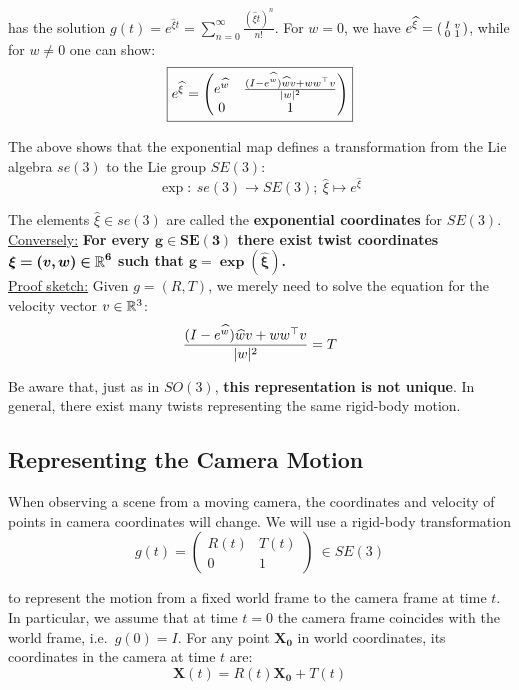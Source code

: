 has the solution $g(t) = e^{\widehat{\xi}t} = \sum_{n=0}^{\infty}
\frac{{(\widehat{\xi}t)}^n}{n!}$.
For $w = 0$, we have $e^{\widehat{\xi}} = \left(\begin{smallmatrix} I & v \\ 0 & 1 \end{smallmatrix} \right)$,
while for $w \ne 0$ one can show:
	\[\boxed{e^{\widehat{\xi}} = \begin{pmatrix}
		e^{\widehat{w}} & \frac{(I-e^{\widehat{w}})\widehat{w}v + ww^{\top}v}{|w|^2}\\
		0 & 1
	\end{pmatrix}}\]

The above shows that the exponential map defines a transformation from
the Lie algebra $se(3)$ to the Lie group $SE(3)$:
	\[ \exp:\ se(3) \rightarrow SE(3);\ \widehat{\xi} \mapsto e^{\widehat{\xi}}\]

The elements $\widehat{\xi} \in se(3)$ are called the
\textbf{exponential coordinates} for $SE(3)$.\\

\underline{Conversely:} \textbf{For every $\bm{g \in SE(3)}$ there exist
twist coordinates $\bm{\xi = (v,w) \in \mathbb{R}^6}$ such that $\bm{g=\exp(\widehat{\xi})}$.}\\

\underline{Proof sketch:} Given $g = (R,T)$, we merely need to solve the equation
for the velocity vector $v \in \mathbb{R}^3$:
	\[\frac{(I-e^{\widehat{w}})\widehat{w}v + ww^{\top}v}{|w|^2} = T\]


Be aware that, just as in $SO(3)$, \textbf{this representation is not unique}.
In general, there exist many twists representing the same rigid-body motion.


\subsection{Representing the Camera Motion}%
\label{sub:representing_the_camera_motion}

When observing a scene from a moving camera, the coordinates and velocity
of points in camera coordinates will change. We will use a rigid-body transformation
	\[g(t) = \begin{pmatrix}
		R(t) & T(t) \\
		0 & 1
	\end{pmatrix}\ \in SE(3)\]

to represent the motion from a fixed world frame to the camera frame at time $t$.
In particular, we assume that at time $t=0$ the camera frame coincides with the
world frame, i.e.\ $g(0)=I$.
For any point $\bm{X_0}$ in world coordinates,
its coordinates in the camera at time $t$ are:
	\[\bm{X}(t) = R(t)\bm{X_0} + T(t)\]

